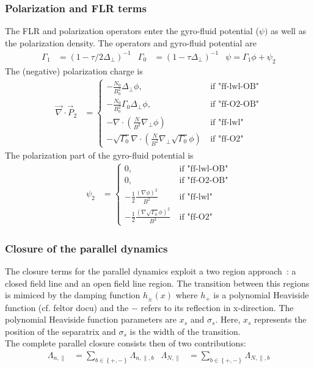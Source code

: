 \subsubsection{Polarization and FLR terms}
\label{sec:polarization}
The FLR and polarization operators enter the gyro-fluid potential (\(\psi)\) as 
well as the polarization density.
The operators and gyro-fluid potential are
\begin{align}
 \Gamma_1 &= ( 1- \tau/2 \Delta_{\perp})^{-1} &
 \Gamma_0 &= ( 1- \tau\Delta_{\perp})^{-1} &
   \psi = \Gamma_1 \phi + \psi_2 
\end{align}
The  (negative) polarization charge is~\cite{Held2020} 
\begin{align}
  \vec{\nabla}\cdot \vec{P}_2 &=    
\begin{cases}
-\frac{N_0}{B_0^2}\Delta_{\perp} \phi , 
        &\ \text{if "ff-lwl-OB"} \\
-\frac{N_0}{B_0^2}\Gamma_0\Delta_{\perp} \phi, 
      &\ \text{if "ff-O2-OB"} \\
-\nabla\cdot \left(\frac{N}{B^2} \nabla_\perp \phi\right)
       &\ \text{if "ff-lwl"} \\
-\sqrt{\Gamma_0}\nabla\cdot \left(\frac{N}{B^2} \nabla_\perp\sqrt{\Gamma_0} 
\phi\right) 
         &\ \text{if "ff-O2"} 
\end{cases}
\end{align}
The polarization part of the gyro-fluid potential is
\begin{align}
\psi_2&=    
\begin{cases}
0 , 
        &\ \text{if "ff-lwl-OB"} \\
0, 
      &\ \text{if "ff-O2-OB"} \\
- \frac{1}{2} \frac{(\nabla\phi)^2}{B^2}
       &\ \text{if "ff-lwl"} \\
- \frac{1}{2} \frac{(\nabla\sqrt{\Gamma_0}\phi)^2}{B^2}
         &\ \text{if "ff-O2"} 
\end{cases}
\end{align}
\subsubsection{Closure of the parallel dynamics}
\label{sec:parallelclosure}
The closure terms for the parallel dynamics exploit a two region 
approach~\cite{HeldPhD}: a closed field line and an open field line region. The 
transition between this regions is mimiced by the damping function \( 
h_{\pm}(x)\)
where \(h_{+}\) is a polynomial Heaviside function (cf. feltor docu) and the 
\(-\) refers to its reflection in x-direction. The polynomial Heaviside function 
parameters are \(x_s\) and \(\sigma_s\).
Here, \(x_s\) represents the position of the separatrix and \(\sigma_s\) is the 
width of the transition. 
\\
The complete parallel closure consists then of two contributions:
\begin{align}
 \Lambda_{n,\parallel} &= \sum_{b \in \left\{+,-\right\} 
}\Lambda_{n,\parallel,b} &
 \Lambda_{N,\parallel} &= \sum_{b \in \left\{+,-\right\} } 
\Lambda_{N,\parallel,b}
\end{align}

